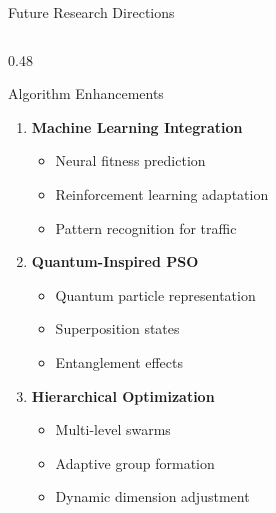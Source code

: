 \documentclass[10pt,aspectratio=169]{beamer}
\begin{document}
\begin{frame}{Future Research Directions}
    \begin{columns}[T]
        \begin{column}{0.48\textwidth}
            \begin{block}{Algorithm Enhancements}
                \begin{enumerate}
                    \item \textbf{Machine Learning Integration}
                    \begin{itemize}
                        \item Neural fitness prediction
                        \item Reinforcement learning adaptation
                        \item Pattern recognition for traffic
                    \end{itemize}
                    \item \textbf{Quantum-Inspired PSO}
                    \begin{itemize}
                        \item Quantum particle representation
                        \item Superposition states
                        \item Entanglement effects
                    \end{itemize}
                    \item \textbf{Hierarchical Optimization}
                    \begin{itemize}
                        \item Multi-level swarms
                        \item Adaptive group formation
                        \item Dynamic dimension adjustment
                    \end{itemize}
                \end{enumerate}
            \end{block}
        \end{column}
        

\end{columns}
\end{frame}
\end{document}
